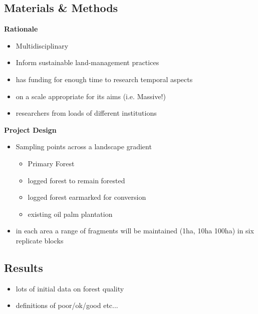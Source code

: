 \subsection*{Materials \& Methods}
\textbf{Rationale}
\begin{itemize}
	\item Multidisciplinary
	\item Inform sustainable land-management practices
	\item has funding for enough time to research temporal aspects
	\item on a scale appropriate for its aims (i.e. Massive!)
	\item researchers from loads of different institutions
\end{itemize}
\textbf{Project Design}
\begin{itemize}
	\item Sampling points across a landscape gradient
	\begin{itemize}
		\item Primary Forest
		\item logged forest to remain forested
		\item logged forest earmarked for conversion
		\item existing oil palm plantation
	\end{itemize}
	\item in each area a range of fragments will be maintained (1ha, 10ha 100ha) in six replicate blocks
\end{itemize}

\subsection*{Results}
\begin{itemize}
	\item lots of initial data on forest quality
	\item definitions of poor/ok/good etc...
\end{itemize}

